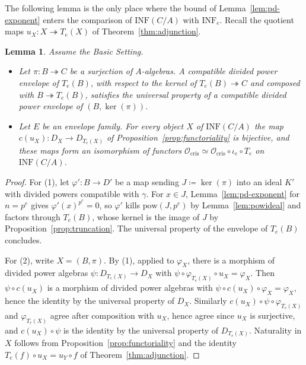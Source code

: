 \documentclass[11pt]{amsart}
\newcommand{\spa}{\medskip}
\newcommand{\Ocris}{\mathcal{O}_{\mathrm{cris}}}
\newcommand{\INF}{\mathrm{INF}}
\newcommand{\pow}{\mathrm{pow}}
\theoremstyle{plain}
\newtheorem{lemma}[theorem]{Lemma}
\theoremstyle{definition}
\theoremstyle{remark}
\begin{document}
The following lemma is the only place where the bound of Lemma~\ref{lem:pd-exponent} enters the comparison of $\INF(C/A)$ with $\INF_e$. Recall the quotient maps $u_X \colon X \twoheadrightarrow T_e(X)$ of Theorem~\ref{thm:adjunction}.

\begin{lemma}\label{lem:truncation-envelope}
Assume the Basic Setting.
\begin{itemize}
\item[\normalfont{(1)}] Let $\pi \colon B \twoheadrightarrow C$ be a surjection of $A$-algebras. A compatible divided power envelope of $T_e(B)$, with respect to the kernel of $T_e(B) \twoheadrightarrow C$ and composed with $B \twoheadrightarrow T_e(B)$, satisfies the universal property of a compatible divided power envelope of $(B, \ker(\pi))$.
\item[\normalfont{(2)}] Let $E$ be an envelope family. For every object $X$ of $\INF(C/A)$ the map $c(u_X) \colon D_X \to D_{T_e(X)}$ of Proposition~\ref{prop:functoriality} is bijective, and these maps form an isomorphism of functors $\Ocris \simeq \Ocris \circ \iota_e \circ T_e$ on $\INF(C/A)$.
\end{itemize}
\end{lemma}

\begin{proof}
For (1), let $\varphi' \colon B \to D'$ be a map sending $J \coloneqq \ker(\pi)$ into an ideal $K'$ with divided powers compatible with $\gamma$. For $x \in J$, Lemma~\ref{lem:pd-exponent} for $n = p^e$ gives $\varphi'(x)^{p^e} = 0$, so $\varphi'$ kills $\pow(J, p^e)$ by Lemma~\ref{lem:powideal} and factors through $T_e(B)$, whose kernel is the image of $J$ by Proposition~\ref{prop:truncation}. The universal property of the envelope of $T_e(B)$ concludes.

\spa

For (2), write $X = (B, \pi)$. By (1), applied to $\varphi_X$, there is a morphism of divided power algebras $\psi \colon D_{T_e(X)} \to D_X$ with $\psi \circ \varphi_{T_e(X)} \circ u_X = \varphi_X$. Then $\psi \circ c(u_X)$ is a morphism of divided power algebras with $\psi \circ c(u_X) \circ \varphi_X = \varphi_X$, hence the identity by the universal property of $D_X$. Similarly $c(u_X) \circ \psi \circ \varphi_{T_e(X)}$ and $\varphi_{T_e(X)}$ agree after composition with $u_X$, hence agree since $u_X$ is surjective, and $c(u_X) \circ \psi$ is the identity by the universal property of $D_{T_e(X)}$. Naturality in $X$ follows from Proposition~\ref{prop:functoriality} and the identity $T_e(f) \circ u_X = u_Y \circ f$ of Theorem~\ref{thm:adjunction}.
\end{proof}
\end{document}
